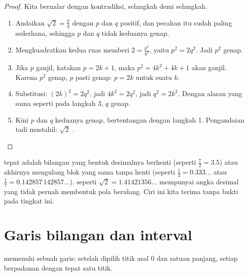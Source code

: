\begin{proof}
Kita bernalar dengan kontradiksi, selangkah demi selangkah.
\begin{enumerate}
  \item Andaikan $\sqrt 2 = \frac{p}{q}$ dengan $p$ dan $q$ 
        positif, dan pecahan itu sudah paling sederhana, sehingga $p$ dan $q$
        tidak keduanya genap.
  \item Mengkuadratkan kedua ruas memberi $2 = \frac{p^2}{q^2}$, yaitu
        $p^2 = 2q^2$. Jadi $p^2$ genap.
  \item Jika $p$ ganjil, katakan $p = 2k+1$, maka
        $p^2 = 4k^2 + 4k + 1$ akan ganjil. Karena $p^2$ genap, $p$ pasti
        genap: $p = 2k$ untuk suatu  $k$.
  \item Substitusi: $(2k)^2 = 2q^2$, jadi $4k^2 = 2q^2$, jadi
        $q^2 = 2k^2$. Dengan alasan yang sama seperti pada langkah 3, $q$ genap.
  \item Kini $p$ dan $q$ keduanya genap, bertentangan dengan langkah 1.
        Pengandaian tadi mustahil: $\sqrt 2$ .
\end{enumerate}
\end{proof}

\begin{remark}
 tepat adalah bilangan yang bentuk desimalnya berhenti
(seperti $\frac72 = 3.5$) atau akhirnya mengulang blok yang sama tanpa henti
(seperti $\frac13 = 0.333\dots$ atau $\frac{1}{7} = 0.142857\,142857\dots$).
 seperti $\sqrt2 = 1.41421356\dots$ mempunyai angka desimal
yang tidak pernah membentuk pola berulang. Ciri ini kita terima tanpa bukti
pada tingkat ini.
\end{remark}

\section{Garis bilangan dan interval}

 memenuhi sebuah garis: setelah dipilih titik asal $0$ dan satuan
panjang, setiap  berpadanan dengan tepat satu titik.


